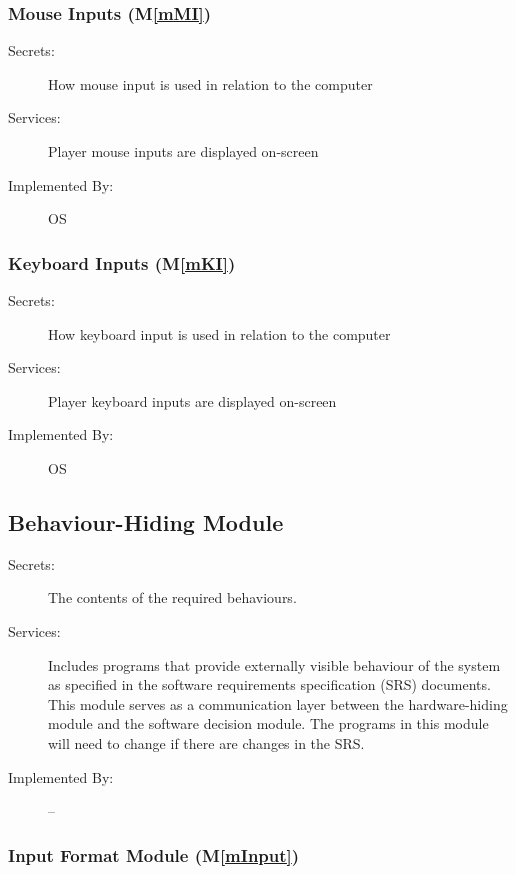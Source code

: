 \documentclass[12pt, titlepage]{article}
\newcommand{\mref}[1]{M\ref{#1}}
\begin{document}
\subsubsection{Mouse Inputs (\mref{mMI})}

\begin{description}
\item[Secrets:] How mouse input is used in relation to the computer
\item[Services:] Player mouse inputs are displayed on-screen 
\item[Implemented By:] OS
\end{description}

\subsubsection{Keyboard Inputs (\mref{mKI})}

\begin{description}
\item[Secrets:] How keyboard input is used in relation to the computer
\item[Services:] Player keyboard inputs are displayed on-screen 
\item[Implemented By:] OS
\end{description}



\subsection{Behaviour-Hiding Module}

\begin{description}
\item[Secrets:]The contents of the required behaviours.
\item[Services:]Includes programs that provide externally visible behaviour of
  the system as specified in the software requirements specification (SRS)
  documents. This module serves as a communication layer between the
  hardware-hiding module and the software decision module. The programs in this
  module will need to change if there are changes in the SRS.
\item[Implemented By:] --
\end{description}

\subsubsection{Input Format Module (\mref{mInput})}
\end{document}

